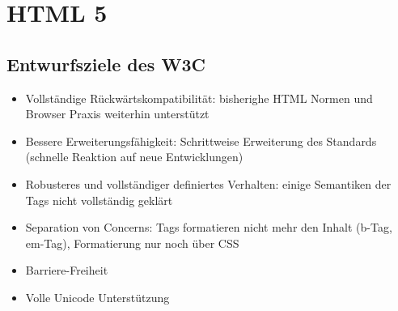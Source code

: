 \documentclass{article} %
\begin{document}
\section{HTML 5}
	\subsection{Entwurfsziele des W3C }
	\begin{itemize}
		\item Vollständige Rückwärtskompatibilität: bisherighe HTML Normen und Browser Praxis weiterhin unterstützt
		\item Bessere Erweiterungsfähigkeit: Schrittweise Erweiterung des Standards (schnelle Reaktion auf neue Entwicklungen)
		\item Robusteres und vollständiger definiertes Verhalten: einige Semantiken der Tags nicht vollständig geklärt
		\item Separation von Concerns: Tags formatieren nicht mehr den Inhalt (b-Tag, em-Tag), Formatierung nur noch über CSS
		\item Barriere-Freiheit
		\item Volle Unicode Unterstützung
	\end{itemize}
\end{document}

